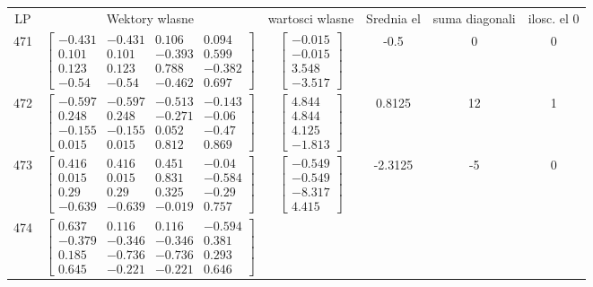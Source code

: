 \documentclass[a4paper,12pt]{article}
\begin{document}
\bgroup {} \vspace{0.2in} \begin{tabular}{c c c c c c}
LP &Wektory wlasne & wartosci wlasne & Srednia el & suma diagonali & ilosc. el 0\\
471
&
$\begin{bmatrix} -0.431 & -0.431 & 0.106 & 0.094 \\ 0.101 & 0.101 & -0.393 & 0.599 \\ 0.123 & 0.123 & 0.788 & -0.382 \\ -0.54 & -0.54 & -0.462 & 0.697 \end{bmatrix}$
&
$\begin{bmatrix} -0.015 \\ -0.015 \\ 3.548 \\ -3.517 \end{bmatrix}$
&
-0.5
&
0
&
0
\\
472
&
$\begin{bmatrix} -0.597 & -0.597 & -0.513 & -0.143 \\ 0.248 & 0.248 & -0.271 & -0.06 \\ -0.155 & -0.155 & 0.052 & -0.47 \\ 0.015 & 0.015 & 0.812 & 0.869 \end{bmatrix}$
&
$\begin{bmatrix} 4.844 \\ 4.844 \\ 4.125 \\ -1.813 \end{bmatrix}$
&
0.8125
&
12
&
1
\\
473
&
$\begin{bmatrix} 0.416 & 0.416 & 0.451 & -0.04 \\ 0.015 & 0.015 & 0.831 & -0.584 \\ 0.29 & 0.29 & 0.325 & -0.29 \\ -0.639 & -0.639 & -0.019 & 0.757 \end{bmatrix}$
&
$\begin{bmatrix} -0.549 \\ -0.549 \\ -8.317 \\ 4.415 \end{bmatrix}$
&
-2.3125
&
-5
&
0
\\
474
&
$\begin{bmatrix} 0.637 & 0.116 & 0.116 & -0.594 \\ -0.379 & -0.346 & -0.346 & 0.381 \\ 0.185 & -0.736 & -0.736 & 0.293 \\ 0.645 & -0.221 & -0.221 & 0.646 \end{bmatrix}$

\end{tabular}
\end{document}
